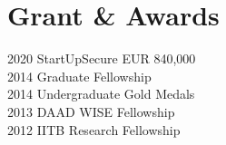 \documentclass[]{deedy-resume-openfont}
\begin{document}
\begin{minipage}[t]{0.29\textwidth}

\section{Grant \& Awards}
2020 \textbullet{}  StartUpSecure EUR 840,000 \\
2014 \textbullet{}  Graduate Fellowship \\
2014 \textbullet{}  Undergraduate Gold Medals \\
2013 \textbullet{}  DAAD WISE Fellowship \\
2012 \textbullet{}  IITB Research Fellowship
\sectionsep

%
%

\end{minipage} 
\hfill
\end{document}
